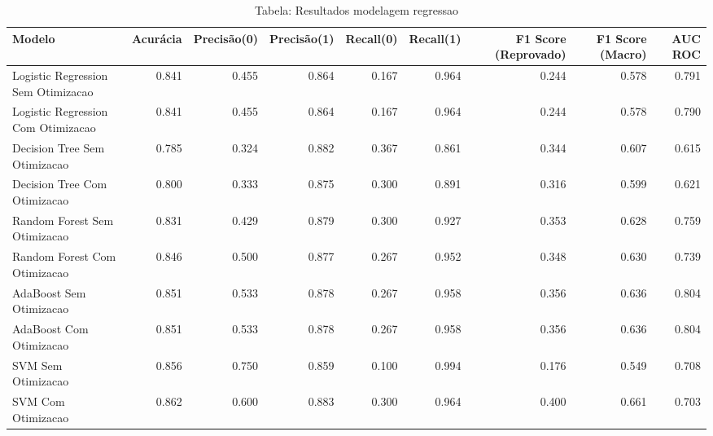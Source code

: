 \begin{table}[H] %
    \centering
    \caption{Tabela: Resultados modelagem regressao}
    \label{tab:resultados_modelagem_regressao}
    \renewcommand{\arraystretch}{1.25} %
    \begin{adjustwidth}{ -1in }{ -1in } %
    \centering %
    \small %
    \begin{tabular}{lrrrrrrrr}
\toprule
                            Modelo &  Acurácia &  Precisão(0) &  Precisão(1) &  Recall(0) &  Recall(1) &  F1 Score (Reprovado) &  F1 Score (Macro) &  AUC ROC \\
\midrule
Logistic Regression Sem Otimizacao &     0.841 &        0.455 &        0.864 &      0.167 &      0.964 &                 0.244 &             0.578 &    0.791 \\
Logistic Regression Com Otimizacao &     0.841 &        0.455 &        0.864 &      0.167 &      0.964 &                 0.244 &             0.578 &    0.790 \\
      Decision Tree Sem Otimizacao &     0.785 &        0.324 &        0.882 &      0.367 &      0.861 &                 0.344 &             0.607 &    0.615 \\
      Decision Tree Com Otimizacao &     0.800 &        0.333 &        0.875 &      0.300 &      0.891 &                 0.316 &             0.599 &    0.621 \\
      Random Forest Sem Otimizacao &     0.831 &        0.429 &        0.879 &      0.300 &      0.927 &                 0.353 &             0.628 &    0.759 \\
      Random Forest Com Otimizacao &     0.846 &        0.500 &        0.877 &      0.267 &      0.952 &                 0.348 &             0.630 &    0.739 \\
           AdaBoost Sem Otimizacao &     0.851 &        0.533 &        0.878 &      0.267 &      0.958 &                 0.356 &             0.636 &    0.804 \\
           AdaBoost Com Otimizacao &     0.851 &        0.533 &        0.878 &      0.267 &      0.958 &                 0.356 &             0.636 &    0.804 \\
                SVM Sem Otimizacao &     0.856 &        0.750 &        0.859 &      0.100 &      0.994 &                 0.176 &             0.549 &    0.708 \\
                SVM Com Otimizacao &     0.862 &        0.600 &        0.883 &      0.300 &      0.964 &                 0.400 &             0.661 &    0.703 \\
\bottomrule
\end{tabular}
    \end{adjustwidth}
    \renewcommand{\arraystretch}{1.0} %
\end{table}
